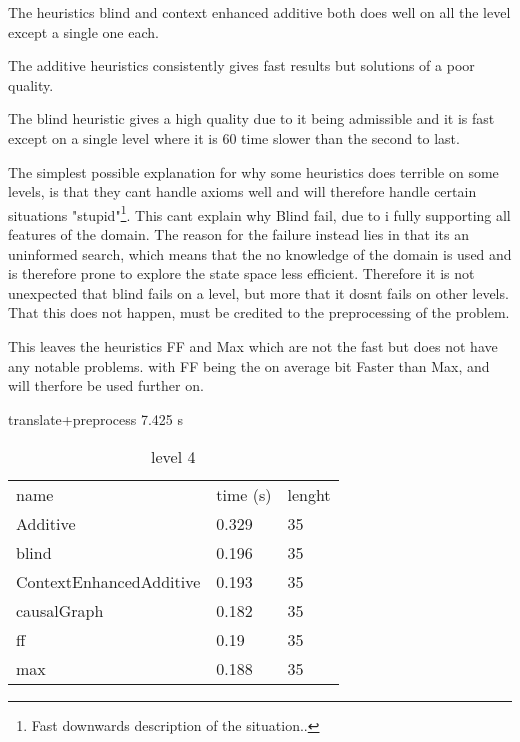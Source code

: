 The heuristics blind and context enhanced additive both does well on all the level except a single one each. 

The additive heuristics consistently gives fast results but solutions of a poor quality.

The blind heuristic gives a high quality due to it being admissible and it is fast except on a single level where it is 60 time slower than the second to last.

The simplest possible explanation for why some heuristics does terrible on some levels, is that they cant handle axioms well and will therefore handle certain situations "stupid"\footnote{Fast downwards description of the situation..}. This cant explain why Blind fail, due to i fully supporting all features of the domain. The reason for the failure instead lies in that its an uninformed search, which means that the no knowledge of the domain is used and is therefore prone to explore the state space less efficient. Therefore it is not unexpected that blind fails on a level, but more that it dosnt fails on other levels. That this does not happen, must be credited to the preprocessing of the problem.


This leaves the heuristics FF and Max which are not the fast but does not have any notable problems. with FF being the on average bit Faster than Max, and will therfore be used further on.





%
%

	\begin{table}[h]
		\centering
		\caption{level 4}
		\label{tablvl4}
		translate+preprocess
		7.425 s\\
		\begin{tabular}{lll}
			name & time (s)& lenght\\
			Additive & 0.329 & 35\\
			blind & 0.196 & 35\\
			ContextEnhancedAdditive & 0.193 & 35\\
			causalGraph & 0.182 & 35\\
			ff & 0.19 & 35\\
			max & 0.188 & 35\\
		\end{tabular}
	\end{table}
	
